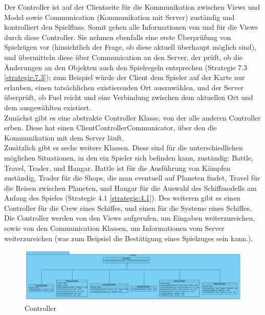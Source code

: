 \documentclass[fontsize=12pt,paper=a4,twoside]{scrartcl}
\begin{document}
Der Controller ist auf der Clientseite für die Kommunikation zwischen Views und Model sowie Communication (Kommunikation mit Server) zuständig und kontrolliert den Spielfluss. Somit gehen alle Informationen von und für die Views durch diese Controller. Sie nehmen ebenfalls eine erste Überprüfung von Spielzügen vor (hinsichtlich der Frage, ob diese aktuell überhaupt möglich sind), und übermitteln diese über Communication an den Server, der prüft, ob die Änderungen an den Objekten auch den Spielregeln entsprechen (Strategie 7.3 \ref{strategie:7.3}); zum Beispiel würde der Client dem Spieler auf der Karte nur erlauben, einen tatsächlichen existierenden Ort auszuwählen, und der Server überprüft, ob Fuel reicht und eine Verbindung zwischen dem aktuellen Ort und dem ausgewählten existiert. \\
Zunächst gibt es eine abstrakte Controller Klasse, von der alle anderen Controller erben. Diese hat einen ClientControllerCommunicator, über den die Kommunikation mit dem Server läuft. \\
Zusätzlich gibt es sechs weitere Klassen. Diese sind für die unterschiedlichen möglichen Situationen, in den ein Spieler sich befinden kann, zuständig: Battle, Travel, Trader, und Hangar. Battle ist für die Ausführung von Kämpfen zuständig, Trader für die Shops, die man eventuell auf Planeten findet, Travel für die Reisen zwischen Planeten, und Hangar für die Auswahl des Schiffmodells am Anfang des Spieles (Strategie 4.1 \ref{strategie:4.1}). Des weiteren gibt es einen Controller für die Crew eines Schiffes, und einen für die Systeme eines Schiffes. \\
Die Controller werden von den Views aufgerufen, um Eingaben weiterzureichen, sowie von den Communication Klassen, um Informationen vom Server weiterzureichen (was zum Beipsiel die Bestätigung eines Spielzuges sein kann.). \\

\begin{figure}[H]
\begin{center}
  \includegraphics[width=\linewidth]{../GT_Modulsicht/src/Controllersicht.png}
    \caption{Controller}
\end{center}
\end{figure}
\end{document}

